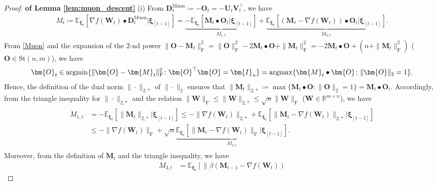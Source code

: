 \documentclass[twoside,11pt]{article}
\newcommand{\argmax}{\operatornamewithlimits{argmax}}
\newcommand{\argmin}{\operatornamewithlimits{argmin}}
\begin{document}
\begin{proof}
\textbf{of Lemma \ref{lem:muon_descent}} 
(i)
From $\bm{D}_t^{\mathrm{Muon}} \coloneqq - \bm{O}_t = - \bm{U}_t \bm{V}_t^\top$, we have 
\begin{align*}
M_t 
\coloneqq
\mathbb{E}_{\bm{\xi}_t} \left[ \nabla f (\bm{W}_t) \bullet \bm{D}_t^{\mathrm{Muon}} |\bm{\xi}_{[t-1]} \right]
= 
\underbrace{- \mathbb{E}_{\bm{\xi}_t} \left[ \bm{M}_t \bullet \bm{O}_t  \Big| \bm{\xi}_{[t-1]} \right]}_{M_{1,t}}
+ \underbrace{\mathbb{E}_{\bm{\xi}_t} \left[ (\bm{M}_t - \nabla f (\bm{W}_t)) \bullet \bm{O}_t  \Big| \bm{\xi}_{[t-1]} \right]}_{M_{2,t}}.
\end{align*}
From \eqref{Muon} and the expansion of the $2$-nd power $\| \bm{O} - \bm{M}_t \|_{\mathrm{F}}^2 = \|\bm{O} \|_{\mathrm{F}}^2 - 2 \bm{M}_t \bullet \bm{O} + \| \bm{M}_t \|_{\mathrm{F}}^2 = - 2 \bm{M}_t \bullet \bm{O} + (n + \| \bm{M}_t \|_{\mathrm{F}}^2)$ ($\bm{O} \in \mathrm{St}(n,m)$), we have 
\begin{align*}
\bm{O}_t  \in \argmin \{ \| \bm{O} - \bm{M}_t \|_{\mathrm{F}}^2 \colon \bm{O}^\top \bm{O} = \bm{I}_n  \}
= \argmax \{  \bm{M}_t \bullet \bm{O} \colon \| \bm{O} \|_2 = 1  \}. 
\end{align*} 
Hence, the definition of the dual norm $\| \cdot \|_{2,*}$ of $\| \cdot \|_{2}$ ensures that $\| \bm{M}_t \|_{2,*} \coloneqq \max \{ \bm{M}_t \bullet \bm{O} \colon \| \bm{O} \|_{2} = 1 \} = \bm{M}_t \bullet \bm{O}_t$. Accordingly, from the triangle inequality for $\| \cdot \|_{2,*}$ and the relation $\| \bm{W} \|_{\mathrm{F}} \leq \|\bm{W} \|_{2,*} \leq \sqrt{n} \|\bm{W}\|_{\mathrm{F}}$ ($\bm{W} \in \mathbb{R}^{m \times n}$), we have
\begin{align}\label{m_3_diff}
\begin{split}
M_{1,t} 
&= - \mathbb{E}_{\bm{\xi}_t} \left[ \| \bm{M}_t \|_{2,*} | \bm{\xi}_{[t-1]} \right]
\leq 
- \| \nabla f (\bm{W}_t) \|_{2,*}
+ \mathbb{E}_{\bm{\xi}_t} \left[ \| \bm{M}_t - \nabla f(\bm{W}_t) \|_{2,*} | \bm{\xi}_{[t-1]} \right]\\
&
\leq 
- \| \nabla f (\bm{W}_t) \|_{\mathrm{F}}
+ \sqrt{n} \underbrace{\mathbb{E}_{\bm{\xi}_t} \left[ \| \bm{M}_t - \nabla f(\bm{W}_t) \|_{\mathrm{F}} | \bm{\xi}_{[t-1]} \right]}_{M_{3,t}}.
\end{split}
\end{align}
Moreover, from the definition of $\bm{M}_t$ and the triangle inequality, we have 
\begin{align*}
M_{3,t} 
&= 
\mathbb{E}_{\bm{\xi}_t} \left[ \| \beta (\bm{M}_{t-1} - \nabla f(\bm{W}_t) )

\end{align*}
\end{proof}
\end{document}
